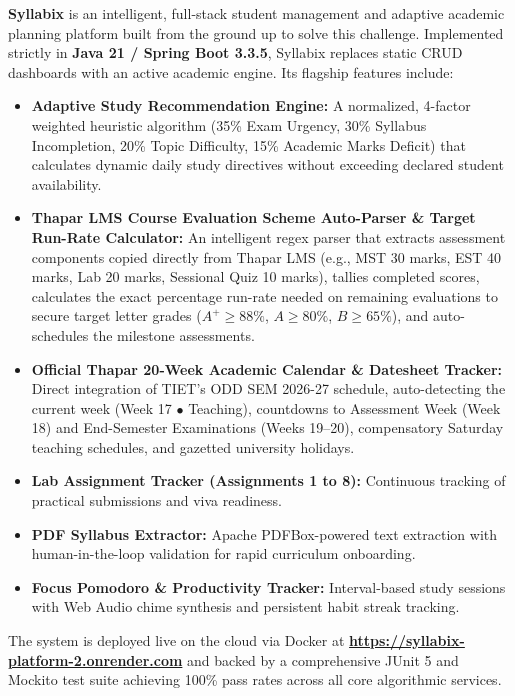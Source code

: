 \documentclass[12pt,a4paper]{report}
\begin{document}
\textbf{Syllabix} is an intelligent, full-stack student management and adaptive academic planning platform built from the ground up to solve this challenge. Implemented strictly in \textbf{Java 21 / Spring Boot 3.3.5}, Syllabix replaces static CRUD dashboards with an active academic engine. Its flagship features include:
\begin{itemize}
    \item \textbf{Adaptive Study Recommendation Engine:} A normalized, 4-factor weighted heuristic algorithm (35\% Exam Urgency, 30\% Syllabus Incompletion, 20\% Topic Difficulty, 15\% Academic Marks Deficit) that calculates dynamic daily study directives without exceeding declared student availability.
    \item \textbf{Thapar LMS Course Evaluation Scheme Auto-Parser \& Target Run-Rate Calculator:} An intelligent regex parser that extracts assessment components copied directly from Thapar LMS (e.g., MST 30 marks, EST 40 marks, Lab 20 marks, Sessional Quiz 10 marks), tallies completed scores, calculates the exact percentage run-rate needed on remaining evaluations to secure target letter grades ($A^+ \ge 88\%$, $A \ge 80\%$, $B \ge 65\%$), and auto-schedules the milestone assessments.
    \item \textbf{Official Thapar 20-Week Academic Calendar \& Datesheet Tracker:} Direct integration of TIET's ODD SEM 2026-27 schedule, auto-detecting the current week (Week 17 $\bullet$ Teaching), countdowns to Assessment Week (Week 18) and End-Semester Examinations (Weeks 19–20), compensatory Saturday teaching schedules, and gazetted university holidays.
    \item \textbf{Lab Assignment Tracker (Assignments 1 to 8):} Continuous tracking of practical submissions and viva readiness.
    \item \textbf{PDF Syllabus Extractor:} Apache PDFBox-powered text extraction with human-in-the-loop validation for rapid curriculum onboarding.
    \item \textbf{Focus Pomodoro \& Productivity Tracker:} Interval-based study sessions with Web Audio chime synthesis and persistent habit streak tracking.
\end{itemize}

The system is deployed live on the cloud via Docker at \href{https://syllabix-platform-2.onrender.com}{\textbf{https://syllabix-platform-2.onrender.com}} and backed by a comprehensive JUnit 5 and Mockito test suite achieving 100\% pass rates across all core algorithmic services.
\end{document}
